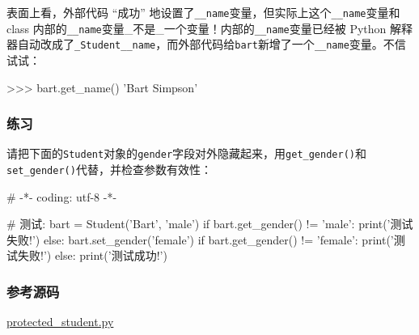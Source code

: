 表面上看，外部代码 ``成功''
地设置了\texttt{\_\_name}变量，但实际上这个\texttt{\_\_name}变量和 class
内部的\texttt{\_\_name}变量\_不是\_一个变量！内部的\texttt{\_\_name}变量已经被
Python
解释器自动改成了\texttt{\_Student\_\_name}，而外部代码给\texttt{bart}新增了一个\texttt{\_\_name}变量。不信试试：

\begin{pythoncode}
>>> bart.get_name() 
'Bart Simpson'
\end{pythoncode}

\hypertarget{ux7ec3ux4e60}{%
\subsubsection{练习}\label{ux7ec3ux4e60}}

请把下面的\texttt{Student}对象的\texttt{gender}字段对外隐藏起来，用\texttt{get\_gender()}和\texttt{set\_gender()}代替，并检查参数有效性：

\begin{pythoncode}
# -*- coding: utf-8 -*-
\end{pythoncode}

\begin{pythoncode}
# 测试:
bart = Student('Bart', 'male')
if bart.get_gender() != 'male':
    print('测试失败!')
else:
    bart.set_gender('female')
    if bart.get_gender() != 'female':
        print('测试失败!')
    else:
        print('测试成功!')
\end{pythoncode}

\hypertarget{ux53c2ux8003ux6e90ux7801}{%
\subsubsection{参考源码}\label{ux53c2ux8003ux6e90ux7801}}

\href{https://github.com/michaelliao/learn-python3/blob/master/samples/oop_basic/protected_student.py}{protected\_student.py}

